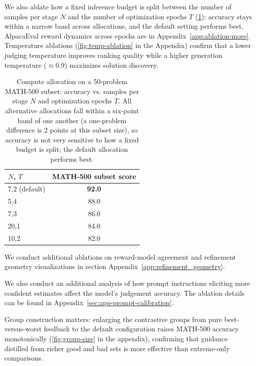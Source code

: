 \documentclass[letterpaper]{article} %
\begin{document}
\textcolor{orange!85!black}{We also ablate how a fixed inference budget is split between the number of samples per stage \(N\) and the number of optimization epochs \(T\) (\cref{tab:ablation-N-epochs}): accuracy stays within a narrow band across allocations, and the default setting performs best.} AlpacaEval reward dynamics across epochs are in Appendix~\ref{app:ablation-more}. Temperature ablations (\cref{fig:temp-ablation} in the Appendix) confirm that a lower judging temperature improves ranking quality while a higher generation temperature (\(\approx 0.9\)) maximizes solution discovery.

\begin{table}[h]
\centering
\begin{small}
\begin{sc}
\color{orange!85!black}
\begin{tabular}{lc}
\toprule
\textbf{$N$, $T$} & \textbf{MATH-500 subset score} \\
\midrule
7,2 (default) & \textbf{92.0} \\
5,4 & 88.0 \\
7,3 & 86.0 \\
20,1 & 84.0 \\
10,2 & 82.0 \\
\bottomrule
\end{tabular}
\end{sc}
\end{small}
\caption{Compute allocation on a 50-problem MATH-500 subset: accuracy vs. samples per stage \(N\) and optimization epochs \(T\). All alternative allocations fall within a six-point band of one another (a one-problem difference is 2 points at this subset size), so accuracy is not very sensitive to how a fixed budget is split; the default allocation performs best.}
\label{tab:ablation-N-epochs}
\end{table}


\noindent We conduct additional ablations on reward-model agreement and refinement geometry visualizations in section Appendix~\ref{app:refinement_geometry}.


We also conduct an additional analysis of how prompt instructions eliciting more confident estimates affect the model's judgement accuracy. The ablation details can be found in Appendix~\ref{sec:app-prompt-calibration}.

\textcolor{orange!85!black}{Group construction matters: enlarging the contrastive groups from pure best-versus-worst feedback to the default configuration raises MATH-500 accuracy monotonically (\cref{fig:group-size} in the appendix), confirming that guidance distilled from richer good and bad sets is more effective than extreme-only comparisons.}
\end{document}
